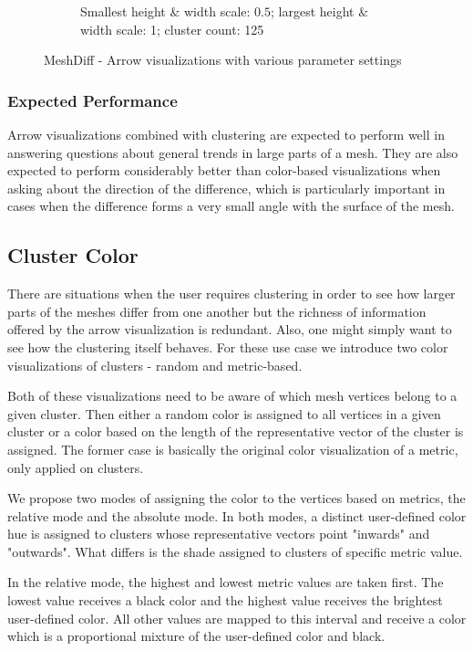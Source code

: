 \begin{figure}[h]
\begin{subfigure}{0.3\textwidth}
    \caption{Smallest height \& width scale: \(0.5\); largest height \& width scale: 1; cluster count: 125}
    \label{fig:meshdiff_arrows_1-125}
	\end{subfigure}
\caption{MeshDiff - Arrow visualizations with various parameter settings}
\end{figure}

\subsubsection{Expected Performance}

Arrow visualizations combined with clustering are expected to perform well in answering questions about general trends in large parts of a mesh. They are also expected to perform considerably better than color-based visualizations when asking about the direction of the difference, which is particularly important in cases when the difference forms a very small angle with the surface of the mesh.
\subsection{Cluster Color}

There are situations when the user requires clustering in order to see how larger parts of the meshes differ from one another but the richness of information offered by the arrow visualization is redundant. Also, one might simply want to see how the clustering itself behaves. For these use case we introduce two color visualizations of clusters - random and metric-based.

Both of these visualizations need to be aware of which mesh vertices belong to a given cluster. Then either a random color is assigned to all vertices in a given cluster or a color based on the length of the representative vector of the cluster is assigned. The former case is basically the original color visualization of a metric, only applied on clusters.

We propose two modes of assigning the color to the vertices based on metrics, the relative mode and the absolute mode. In both modes, a distinct user-defined color hue is assigned to clusters whose representative vectors point "inwards" and "outwards". What differs is the shade assigned to clusters of specific metric value.

In the relative mode, the highest and lowest metric values are taken first. The lowest value receives a black color and the highest value receives the brightest user-defined color. All other values are mapped to this interval and receive a color which is a proportional mixture of the user-defined color and black.

